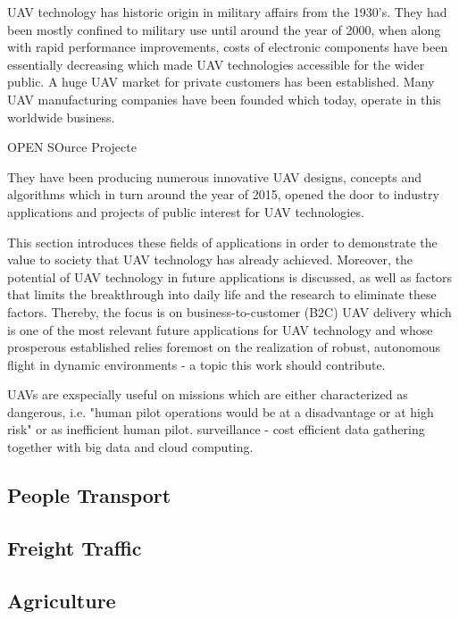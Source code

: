 UAV technology has historic origin
in military
affairs from the 1930's.
They had been mostly confined to military use
until around the year of 2000,
when along with
rapid performance improvements,
costs of electronic components
have been essentially decreasing 
which made UAV technologies 
accessible for the wider public.
A huge UAV market for private customers
has been established. Many UAV manufacturing
companies have been founded which today,
operate in this worldwide business.


OPEN SOurce Projecte

They have been producing
numerous innovative
UAV designs, concepts and algorithms
which in turn around
the year of 2015, opened the door
to industry applications
and projects of public interest
for UAV technologies.

This section introduces these
fields of applications in order
to demonstrate the value to society
that UAV technology has already achieved.
Moreover, the potential of UAV technology
in future applications is discussed,
as well as factors that limits the 
breakthrough into daily life
and the research to eliminate these factors.
Thereby, the focus is on 
business-to-customer (B2C) UAV delivery
which is one of the most relevant future applications
for UAV technology and whose prosperous 
established relies foremost 
on the realization of robust,
autonomous flight in dynamic environments -
a topic this work should contribute.


UAVs are exspecially useful on missions
which are either characterized 
as dangerous, 
i.e. "human pilot operations would be at a disadvantage or at high risk"
\cite{Watts2012}
or as inefficient
human pilot.
surveillance - 
cost efficient data gathering together with big data and cloud computing.




\subsection{People Transport}


\subsection{Freight Traffic}

\subsection{Agriculture}

